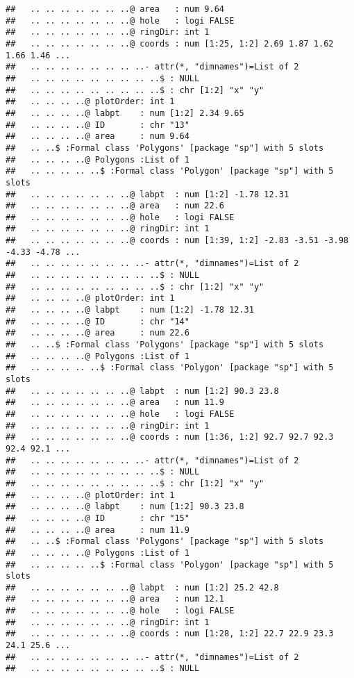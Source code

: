 \documentclass[]{article}
\begin{document}
\begin{verbatim}
##   .. .. .. .. .. .. ..@ area   : num 9.64
##   .. .. .. .. .. .. ..@ hole   : logi FALSE
##   .. .. .. .. .. .. ..@ ringDir: int 1
##   .. .. .. .. .. .. ..@ coords : num [1:25, 1:2] 2.69 1.87 1.62 1.66 1.46 ...
##   .. .. .. .. .. .. .. ..- attr(*, "dimnames")=List of 2
##   .. .. .. .. .. .. .. .. ..$ : NULL
##   .. .. .. .. .. .. .. .. ..$ : chr [1:2] "x" "y"
##   .. .. .. ..@ plotOrder: int 1
##   .. .. .. ..@ labpt    : num [1:2] 2.34 9.65
##   .. .. .. ..@ ID       : chr "13"
##   .. .. .. ..@ area     : num 9.64
##   .. ..$ :Formal class 'Polygons' [package "sp"] with 5 slots
##   .. .. .. ..@ Polygons :List of 1
##   .. .. .. .. ..$ :Formal class 'Polygon' [package "sp"] with 5 slots
##   .. .. .. .. .. .. ..@ labpt  : num [1:2] -1.78 12.31
##   .. .. .. .. .. .. ..@ area   : num 22.6
##   .. .. .. .. .. .. ..@ hole   : logi FALSE
##   .. .. .. .. .. .. ..@ ringDir: int 1
##   .. .. .. .. .. .. ..@ coords : num [1:39, 1:2] -2.83 -3.51 -3.98 -4.33 -4.78 ...
##   .. .. .. .. .. .. .. ..- attr(*, "dimnames")=List of 2
##   .. .. .. .. .. .. .. .. ..$ : NULL
##   .. .. .. .. .. .. .. .. ..$ : chr [1:2] "x" "y"
##   .. .. .. ..@ plotOrder: int 1
##   .. .. .. ..@ labpt    : num [1:2] -1.78 12.31
##   .. .. .. ..@ ID       : chr "14"
##   .. .. .. ..@ area     : num 22.6
##   .. ..$ :Formal class 'Polygons' [package "sp"] with 5 slots
##   .. .. .. ..@ Polygons :List of 1
##   .. .. .. .. ..$ :Formal class 'Polygon' [package "sp"] with 5 slots
##   .. .. .. .. .. .. ..@ labpt  : num [1:2] 90.3 23.8
##   .. .. .. .. .. .. ..@ area   : num 11.9
##   .. .. .. .. .. .. ..@ hole   : logi FALSE
##   .. .. .. .. .. .. ..@ ringDir: int 1
##   .. .. .. .. .. .. ..@ coords : num [1:36, 1:2] 92.7 92.7 92.3 92.4 92.1 ...
##   .. .. .. .. .. .. .. ..- attr(*, "dimnames")=List of 2
##   .. .. .. .. .. .. .. .. ..$ : NULL
##   .. .. .. .. .. .. .. .. ..$ : chr [1:2] "x" "y"
##   .. .. .. ..@ plotOrder: int 1
##   .. .. .. ..@ labpt    : num [1:2] 90.3 23.8
##   .. .. .. ..@ ID       : chr "15"
##   .. .. .. ..@ area     : num 11.9
##   .. ..$ :Formal class 'Polygons' [package "sp"] with 5 slots
##   .. .. .. ..@ Polygons :List of 1
##   .. .. .. .. ..$ :Formal class 'Polygon' [package "sp"] with 5 slots
##   .. .. .. .. .. .. ..@ labpt  : num [1:2] 25.2 42.8
##   .. .. .. .. .. .. ..@ area   : num 12.1
##   .. .. .. .. .. .. ..@ hole   : logi FALSE
##   .. .. .. .. .. .. ..@ ringDir: int 1
##   .. .. .. .. .. .. ..@ coords : num [1:28, 1:2] 22.7 22.9 23.3 24.1 25.6 ...
##   .. .. .. .. .. .. .. ..- attr(*, "dimnames")=List of 2
##   .. .. .. .. .. .. .. .. ..$ : NULL

\end{verbatim}
\end{document}
